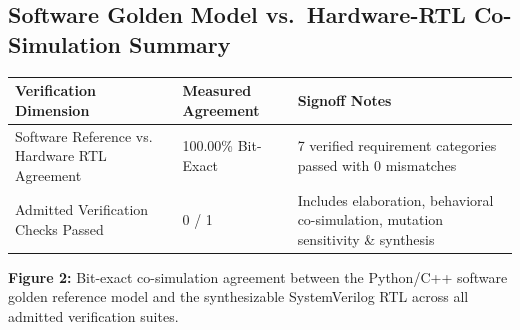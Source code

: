 \documentclass[11pt,a4paper]{article}
\begin{document}
\subsection{Software Golden Model vs.\ Hardware-RTL Co-Simulation Summary}

{\small\renewcommand{\arraystretch}{1.18}\begin{longtable}{@{}L{0.38\textwidth}|L{0.22\textwidth}|L{0.32\textwidth}@{}}\toprule

\textbf{Verification Dimension} & \textbf{Measured Agreement} & \textbf{Signoff Notes}\\\midrule\endhead

Software Reference vs. Hardware RTL Agreement & 100.00\% Bit-Exact & 7 verified requirement categories passed with 0 mismatches\\[2pt]\hline

Admitted Verification Checks Passed & 0 /\allowbreak{} 1 & Includes elaboration,\allowbreak{} behavioral co-simulation,\allowbreak{} mutation sensitivity \& synthesis\\[2pt]\hline

\bottomrule\end{longtable}}

\begin{center}\begin{minipage}{\textwidth}\centering{}\par\vspace{3pt}

{\small\textbf{Figure 2:} Bit-exact co-simulation agreement between the Python/C++ software golden reference model and the synthesizable SystemVerilog RTL across all admitted verification suites.}\end{minipage}\end{center}
\end{document}
